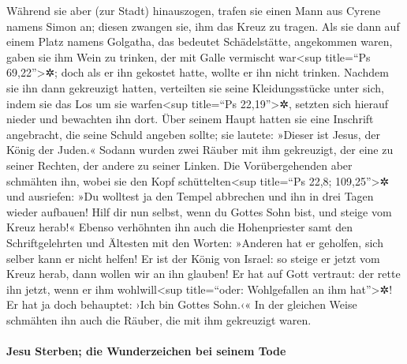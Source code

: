  Während sie aber (zur Stadt) hinauszogen, trafen sie
einen Mann aus Cyrene namens Simon an; diesen zwangen sie, ihm das Kreuz
zu tragen.  Als sie dann auf einem Platz namens Golgatha,
das bedeutet Schädelstätte, angekommen waren,  gaben sie
ihm Wein zu trinken, der mit Galle vermischt war\textless sup title=``Ps
69,22''\textgreater✲; doch als er ihn gekostet hatte, wollte er ihn
nicht trinken.  Nachdem sie ihn dann gekreuzigt hatten,
verteilten sie seine Kleidungsstücke unter sich, indem sie das Los um
sie warfen\textless sup title=``Ps 22,19''\textgreater✲, 
setzten sich hierauf nieder und bewachten ihn dort.  Über
seinem Haupt hatten sie eine Inschrift angebracht, die seine Schuld
angeben sollte; sie lautete: »Dieser ist Jesus, der König der Juden.«
 Sodann wurden zwei Räuber mit ihm gekreuzigt, der eine
zu seiner Rechten, der andere zu seiner Linken.  Die
Vorübergehenden aber schmähten ihn, wobei sie den Kopf
schüttelten\textless sup title=``Ps 22,8; 109,25''\textgreater✲
 und ausriefen: »Du wolltest ja den Tempel abbrechen und
ihn in drei Tagen wieder aufbauen! Hilf dir nun selbst, wenn du Gottes
Sohn bist, und steige vom Kreuz herab!«  Ebenso
verhöhnten ihn auch die Hohenpriester samt den Schriftgelehrten und
Ältesten mit den Worten:  »Anderen hat er geholfen, sich
selber kann er nicht helfen! Er ist der König von Israel: so steige er
jetzt vom Kreuz herab, dann wollen wir an ihn glauben! 
Er hat auf Gott vertraut: der rette ihn jetzt, wenn er ihm
wohlwill\textless sup title=``oder: Wohlgefallen an ihm
hat''\textgreater✲! Er hat ja doch behauptet: ›Ich bin Gottes Sohn.‹«
 In der gleichen Weise schmähten ihn auch die Räuber, die
mit ihm gekreuzigt waren.

\hypertarget{jesu-sterben-die-wunderzeichen-bei-seinem-tode}{%
\paragraph{Jesu Sterben; die Wunderzeichen bei seinem
Tode}\label{jesu-sterben-die-wunderzeichen-bei-seinem-tode}}

